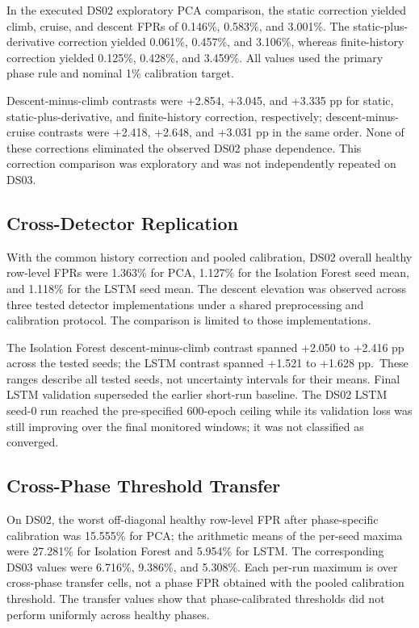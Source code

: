 \documentclass[10pt,conference]{IEEEtran}
\begin{document}
In the executed DS02 exploratory PCA comparison, the static correction yielded climb, cruise, and descent FPRs of 0.146\%, 0.583\%, and 3.001\%. The static-plus-derivative correction yielded 0.061\%, 0.457\%, and 3.106\%, whereas finite-history correction yielded 0.125\%, 0.428\%, and 3.459\%. All values used the primary phase rule and nominal 1\% calibration target.

Descent-minus-climb contrasts were +2.854, +3.045, and +3.335 pp for static, static-plus-derivative, and finite-history correction, respectively; descent-minus-cruise contrasts were +2.418, +2.648, and +3.031 pp in the same order. None of these corrections eliminated the observed DS02 phase dependence. This correction comparison was exploratory and was not independently repeated on DS03.

\subsection{Cross-Detector Replication}\label{cross-detector-replication}

With the common history correction and pooled calibration, DS02 overall healthy row-level FPRs were 1.363\% for PCA, 1.127\% for the Isolation Forest seed mean, and 1.118\% for the LSTM seed mean. The descent elevation was observed across three tested detector implementations under a shared preprocessing and calibration protocol. The comparison is limited to those implementations.

The Isolation Forest descent-minus-climb contrast spanned +2.050 to +2.416 pp across the tested seeds; the LSTM contrast spanned +1.521 to +1.628 pp.~These ranges describe all tested seeds, not uncertainty intervals for their means. Final LSTM validation superseded the earlier short-run baseline. The DS02 LSTM seed-0 run reached the pre-specified 600-epoch ceiling while its validation loss was still improving over the final monitored windows; it was not classified as converged.

\subsection{Cross-Phase Threshold Transfer}\label{cross-phase-threshold-transfer}

On DS02, the worst off-diagonal healthy row-level FPR after phase-specific calibration was 15.555\% for PCA; the arithmetic means of the per-seed maxima were 27.281\% for Isolation Forest and 5.954\% for LSTM. The corresponding DS03 values were 6.716\%, 9.386\%, and 5.308\%. Each per-run maximum is over cross-phase transfer cells, not a phase FPR obtained with the pooled calibration threshold. The transfer values show that phase-calibrated thresholds did not perform uniformly across healthy phases.
\end{document}
